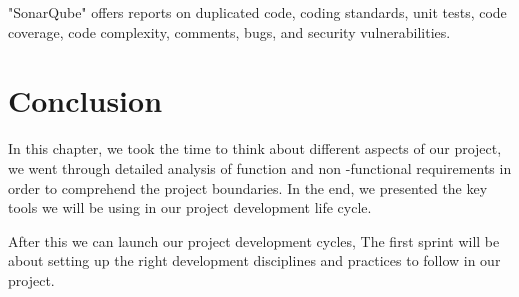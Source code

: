 \begin{spacing}{1.2}
"SonarQube" offers reports on duplicated code, coding standards, unit tests, code coverage, code complexity, comments, bugs, and security vulnerabilities.
\section*{Conclusion}
In this chapter, we took the time to think about different aspects of our project, we went through detailed analysis of function and non -functional requirements in order to comprehend the project boundaries. 
In the end, we presented the key tools we will be using in our project development life cycle.

After this we can launch our project development cycles, The first sprint will be about setting up the right development disciplines and practices to follow in our project.

\end{spacing}
